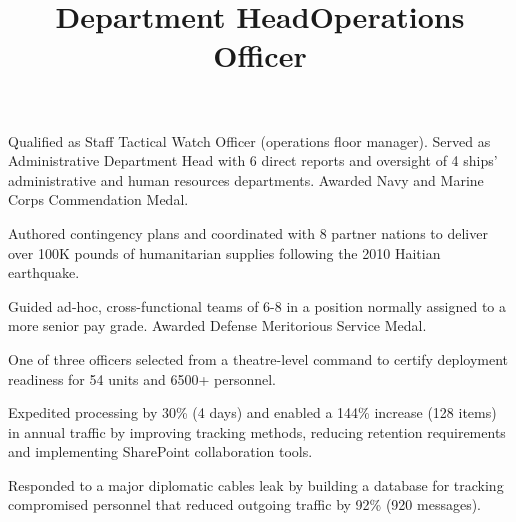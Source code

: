 \documentclass[line]{res}
\begin{document}
\begin{resume}
\title{{\bf Department Head}}
\begin{position}
\vspace*{-.2cm}
\begin{list2}
	\item Qualified as Staff Tactical Watch Officer (operations floor manager). Served as Administrative Department Head with 6 direct reports and oversight of 4 ships' administrative and human resources departments. Awarded Navy and Marine Corps Commendation Medal.
	\item Authored contingency plans and coordinated with 8 partner nations to deliver over 100K pounds of humanitarian supplies following the 2010 Haitian earthquake. 
\end{list2}
\end{position}

\title{{\bf Operations Officer}}
\begin{position}
\vspace*{-.2cm}
\begin{list2}
	\item Guided ad-hoc, cross-functional teams of 6-8 in a position normally assigned to a more senior pay grade. Awarded Defense Meritorious Service Medal.
	\item One of three officers selected from a theatre-level command to certify deployment readiness for 54 units and 6500+ personnel.
	\item Expedited processing by 30\% (4 days) and enabled a 144\% increase (128 items) in annual traffic by improving tracking methods, reducing retention requirements and implementing SharePoint collaboration tools.
	\item Responded to a major diplomatic cables leak by building a database for tracking compromised personnel that reduced outgoing traffic by 92\% (920 messages).	
\end{list2}
\end{position}


\end{resume}
\end{document}

